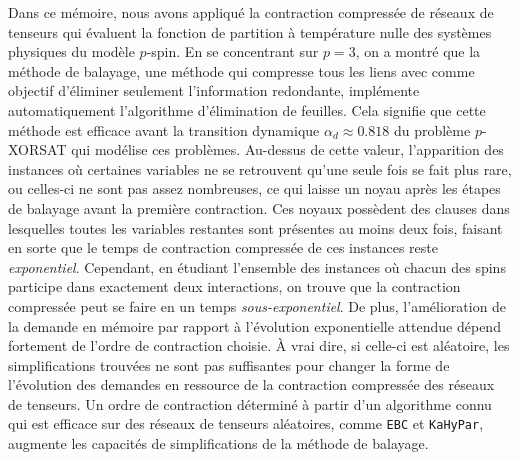 \begin{comment}
\end{comment}

\Conclusion %

Dans ce mémoire, nous avons appliqué la contraction compressée de réseaux de tenseurs qui évaluent la fonction de partition à température nulle des systèmes physiques du modèle $p$-spin.
En se concentrant sur $p = 3$, on a montré que la méthode de balayage, une méthode qui compresse tous les liens avec comme objectif d'éliminer seulement l'information redondante, implémente automatiquement l'algorithme d'élimination de feuilles.
Cela signifie que cette méthode est efficace avant la transition dynamique $\alpha_d \approx 0.818$ du problème $p$-XORSAT qui modélise ces problèmes.
Au-dessus de cette valeur, l'apparition des instances où certaines variables ne se retrouvent qu'une seule fois se fait plus rare, ou celles-ci ne sont pas assez nombreuses, ce qui laisse un noyau après les étapes de balayage avant la première contraction.
Ces noyaux possèdent des clauses dans lesquelles toutes les variables restantes sont présentes au moins deux fois, faisant en sorte que le temps de contraction compressée de ces instances reste \emph{exponentiel}.
Cependant, en étudiant l'ensemble des instances où chacun des spins participe dans exactement deux interactions, on trouve que la contraction compressée peut se faire en un temps \emph{sous-exponentiel}.
De plus, l'amélioration de la demande en mémoire par rapport à l'évolution exponentielle attendue dépend fortement de l'ordre de contraction choisie.
À vrai dire, si celle-ci est aléatoire, les simplifications trouvées ne sont pas suffisantes pour changer la forme de l'évolution des demandes en ressource de la contraction compressée des réseaux de tenseurs.
Un ordre de contraction déterminé à partir d'un algorithme connu qui est efficace sur des réseaux de tenseurs aléatoires, comme \verb|EBC| et \verb|KaHyPar|, augmente les capacités de simplifications de la méthode de balayage.

